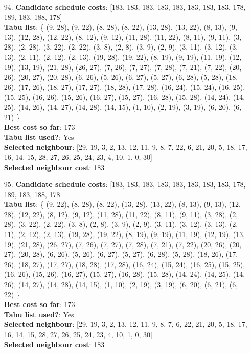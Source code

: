 \documentclass[fleqn]{article}
\begin{document}
\begin{itemize}
    \item[94.] \textbf{Candidate schedule costs}: [183, 183, 183, 183, 183, 183, 183, 183, 178, 189, 183, 188, 178] \\
    \textbf{Tabu list}: \{ (9, 28), (9, 22), (8, 28), (8, 22), (13, 28), (13, 22), (8, 13), (9, 13), (12, 28), (12, 22), (8, 12), (9, 12), (11, 28), (11, 22), (8, 11), (9, 11), (3, 28), (2, 28), (3, 22), (2, 22), (3, 8), (2, 8), (3, 9), (2, 9), (3, 11), (3, 12), (3, 13), (2, 11), (2, 12), (2, 13), (19, 28), (19, 22), (8, 19), (9, 19), (11, 19), (12, 19), (13, 19), (21, 28), (26, 27), (7, 26), (7, 27), (7, 28), (7, 21), (7, 22), (20, 26), (20, 27), (20, 28), (6, 26), (5, 26), (6, 27), (5, 27), (6, 28), (5, 28), (18, 26), (17, 26), (18, 27), (17, 27), (18, 28), (17, 28), (16, 24), (15, 24), (16, 25), (15, 25), (16, 26), (15, 26), (16, 27), (15, 27), (16, 28), (15, 28), (14, 24), (14, 25), (14, 26), (14, 27), (14, 28), (14, 15), (1, 10), (2, 19), (3, 19), (6, 20), (6, 21) \} \\
    \textbf{Best cost so far}: 173 \\
    \textbf{Tabu list used?}: Yes \\
    \textbf{Selected neighbour}: [29, 19, 3, 2, 13, 12, 11, 9, 8, 7, 22, 6, 21, 20, 5, 18, 17, 16, 14, 15, 28, 27, 26, 25, 24, 23, 4, 10, 1, 0, 30] \\
    \textbf{Selected neighbour cost}: 183
      

    \item[95.] \textbf{Candidate schedule costs}: [183, 183, 183, 183, 183, 183, 183, 183, 178, 189, 183, 188, 178] \\
    \textbf{Tabu list}: \{ (9, 22), (8, 28), (8, 22), (13, 28), (13, 22), (8, 13), (9, 13), (12, 28), (12, 22), (8, 12), (9, 12), (11, 28), (11, 22), (8, 11), (9, 11), (3, 28), (2, 28), (3, 22), (2, 22), (3, 8), (2, 8), (3, 9), (2, 9), (3, 11), (3, 12), (3, 13), (2, 11), (2, 12), (2, 13), (19, 28), (19, 22), (8, 19), (9, 19), (11, 19), (12, 19), (13, 19), (21, 28), (26, 27), (7, 26), (7, 27), (7, 28), (7, 21), (7, 22), (20, 26), (20, 27), (20, 28), (6, 26), (5, 26), (6, 27), (5, 27), (6, 28), (5, 28), (18, 26), (17, 26), (18, 27), (17, 27), (18, 28), (17, 28), (16, 24), (15, 24), (16, 25), (15, 25), (16, 26), (15, 26), (16, 27), (15, 27), (16, 28), (15, 28), (14, 24), (14, 25), (14, 26), (14, 27), (14, 28), (14, 15), (1, 10), (2, 19), (3, 19), (6, 20), (6, 21), (6, 22) \} \\
    \textbf{Best cost so far}: 173 \\
    \textbf{Tabu list used?}: Yes \\
    \textbf{Selected neighbour}: [29, 19, 3, 2, 13, 12, 11, 9, 8, 7, 6, 22, 21, 20, 5, 18, 17, 16, 14, 15, 28, 27, 26, 25, 24, 23, 4, 10, 1, 0, 30] \\
    \textbf{Selected neighbour cost}: 183
      


\end{itemize}
\end{document}
